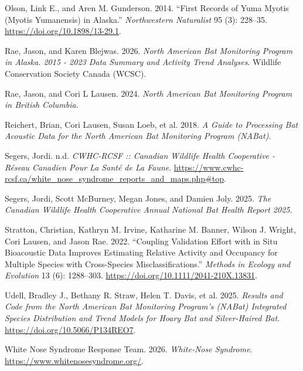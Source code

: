 \documentclass[
  letterpaper,
  DIV=11,
  numbers=noendperiod]{scrartcl}
\newlength{\cslhangindent}
\newenvironment{CSLReferences}[2] %
 {\begin{list}{}{%
  \setlength{\itemindent}{0pt}
  \setlength{\leftmargin}{0pt}
  \setlength{\parsep}{0pt}
  \ifodd #1
   \setlength{\leftmargin}{\cslhangindent}
   \setlength{\itemindent}{-1\cslhangindent}
  \fi
  \setlength{\itemsep}{#2\baselineskip}}}
 {\end{list}}
\begin{document}
\begin{CSLReferences}{1}{1}
Olson, Link E., and Aren M. Gunderson. 2014. {``First {Records} of {Yuma
Myotis} ({Myotis} Yumanensis) in {Alaska}.''} \emph{Northwestern
Naturalist} 95 (3): 228--35. \url{https://doi.org/10.1898/13-29.1}.

Rae, Jason, and Karen Blejwas. 2026. \emph{North {American Bat
Monitoring Program} in {Alaska}. 2015 - 2023 {Data Summary} and
{Activity Trend Analyses}}. {Wildlife Conservation Society Canada
(WCSC)}.

Rae, Jason, and Cori L Lausen. 2024. \emph{North American Bat Monitoring
Program in British Columbia}.

Reichert, Brian, Cori Lausen, Susan Loeb, et al. 2018. \emph{A Guide to
Processing Bat Acoustic Data for the North American Bat Monitoring
Program (NABat)}.

Segers, Jordi. n.d. \emph{CWHC-RCSF :: Canadian Wildlife Health
Cooperative - Réseau Canadien Pour La Santé de La Faune}.
\url{https://www.cwhc-rcsf.ca/white_nose_syndrome_reports_and_maps.php\#top}.

Segers, Jordi, Scott McBurney, Megan Jones, and Damien Joly. 2025.
\emph{The Canadian Wildlife Health Cooperative Annual National Bat
Health Report {\textendash} 2025}.

Stratton, Christian, Kathryn M. Irvine, Katharine M. Banner, Wilson J.
Wright, Cori Lausen, and Jason Rae. 2022. {``Coupling Validation Effort
with in Situ Bioacoustic Data Improves Estimating Relative Activity and
Occupancy for Multiple Species with Cross{-}Species
Misclassifications.''} \emph{Methods in Ecology and Evolution} 13 (6):
1288--303. \url{https://doi.org/10.1111/2041-210X.13831}.

Udell, Bradley J., Bethany R. Straw, Helen T. Davis, et al. 2025.
\emph{Results and Code from the North American Bat Monitoring Program's
(NABat) Integrated Species Distribution and Trend Models for Hoary Bat
and Silver-Haired Bat}. \url{https://doi.org/10.5066/P134REO7}.

White Nose Syndrome Response Team. 2026. \emph{White-Nose Syndrome}.
\url{https://www.whitenosesyndrome.org/}.

\end{CSLReferences}
\end{document}
